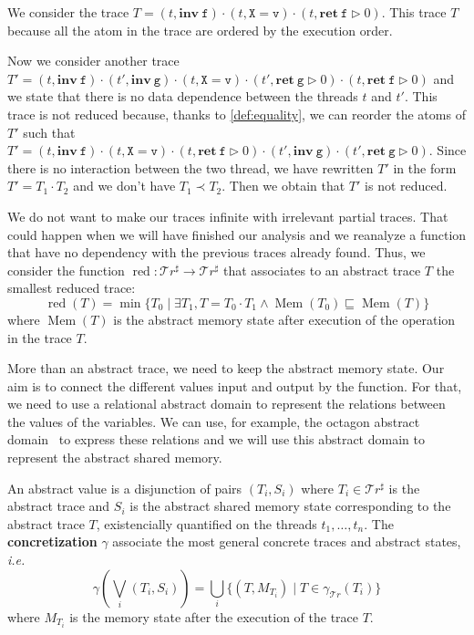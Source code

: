 \documentclass[runningheads]{llncs}
\newcommand{\inv}[1]{\mathbf{inv}\ \mathtt{#1}}
\newcommand{\ret}[2]{\mathbf{ret}\ \mathtt{#1} \vartriangleright #2}
\newcommand{\Traces}{\mathcal T\!r}
\newcommand{\aTraces}{\mathcal T\!r^\sharp}
\DeclareMathOperator{\red}{red}
\DeclareMathOperator{\Mem}{Mem}
\begin{document}
\begin{example}
	We consider the trace $T = (t, \inv{f}) \cdot (t, \mathtt{X} = \mathtt{v}) \cdot (t, \ret{f}{0})$.
	This trace $T$ because all the atom in the trace are ordered by the execution order.
	
	Now we consider another trace $T' = (t, \inv{f}) \cdot (t', \inv g) \cdot (t, \mathtt{X} = \mathtt{v}) \cdot (t', \ret g 0) \cdot (t, \ret{f}{0})$
	and we state that there is no data dependence between the threads $t$ and $t'$. 
	This trace is not reduced because, thanks to \ref{def:equality}, we can reorder the atoms of $T'$ such that $T' =  (t, \inv{f}) \cdot (t, \mathtt{X} = \mathtt{v}) \cdot (t, \ret{f}{0}) \cdot (t', \inv g) \cdot (t', \ret g 0)$. Since there is no interaction between the two thread, we have rewritten $T'$ in the form $T' = T_1 \cdot T_2$ and we don't have $T_1 \prec T_2$. Then we obtain that $T'$ is not reduced.
\end{example}


We do not want to make our traces infinite with irrelevant partial traces. That could happen when we will have finished our analysis and we reanalyze a function that have no dependency with the previous traces already found. Thus, we consider the function $\red : \aTraces \rightarrow \aTraces$ that associates to an abstract trace $T$ the smallest reduced trace:
\begin{equation} \label{eq:red}
	\red(T) = \min \{T_0 \mid \exists T_1, T = T_0 \cdot T_1 \wedge \Mem(T_0) \sqsubseteq \Mem(T)\}
\end{equation}%
where $\Mem(T)$ is the abstract memory state after execution of the operation in the trace $T$. 


More than an abstract trace, we need to keep the abstract memory state. Our aim is to connect the different values input and output by the function. For that, we need to use a relational abstract domain to represent the relations between the values of the variables. We can use, for example, the octagon abstract domain~\cite{DBLP:journals/lisp/Mine06} to express these relations and we will use this abstract domain to represent the abstract shared memory.



\begin{definition}
	An abstract value is a disjunction of pairs $(T_i, S_i)$ where $T_i \in \aTraces$ is the abstract trace and $S_i$ is the abstract shared memory state corresponding to the abstract trace $T$, existencially quantified on the threads $t_1, \dots, t_n$. The \textbf{concretization} $\gamma$ associate the most general concrete traces and abstract states, \emph{i.e.}
	\[\gamma\left(\bigvee_i (T_i, S_i)\right) = \bigcup_i \{ (T, M_{T_i}) \mid T\in\gamma_{\Traces}(T_i) \}\]
	where $M_{T_i}$ is the memory state after the execution of the trace $T$. 
\end{definition}
\end{document}
